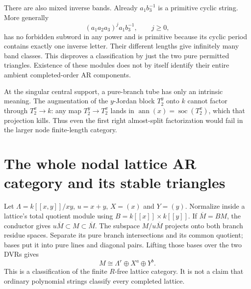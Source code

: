 \documentclass[11pt,oneside,openany]{book}
\theoremstyle{definition}\newtheorem{definition}[theorem]{Definition}
\theoremstyle{remark}\newtheorem{remark}[theorem]{Remark}
\begin{document}
There are also mixed inverse bands. Already $a_1b_3^{-1}$ is a primitive
cyclic string. More generally
\[
 (a_1a_2a_3)^j a_1b_3^{-1},\qquad j\ge0,
\]
has no forbidden subword in any power and is primitive because its cyclic
period contains exactly one inverse letter. Their different lengths give
infinitely many band classes. This disproves a classification by just the
two pure permitted triangles. Existence of these modules does not by itself
identify their entire ambient completed-order AR components.

At the singular central support, a pure-branch tube has only an intrinsic
meaning. The augmentation of the $y$-Jordan block $T_2^y$ onto $k$ cannot
factor through $T_2^x\to k$: any map $T_2^y\to T_2^x$ lands in
$\operatorname{ann}(x)=\operatorname{soc}(T_2^x)$, which that projection kills.
Thus even the first right almost-split factorization would fail in the larger
node finite-length category.

\section[Nodal lattice AR geometry]{The whole nodal lattice AR category and its stable triangles}
Let $\Lambda=k[[x,y]]/xy$, $u=x+y$, $X=(x)$ and $Y=(y)$. Normalize inside a
lattice's total quotient module using $B=k[[x]]\times k[[y]]$. If
$\overline M=BM$, the conductor gives
$u\overline M\subset M\subset\overline M$. The subspace
$M/u\overline M$ projects onto both branch residue spaces. Separate its pure
branch intersections and its common quotient; bases put it into pure lines
and diagonal pairs. Lifting those bases over the two DVRs gives
\begin{equation}\label{arb:nodeclassification}
 M\cong\Lambda^r\oplus X^a\oplus Y^b.
\end{equation}
This is a classification of the finite $R$-free lattice category. It is not a
claim that ordinary polynomial strings classify every completed lattice.
\end{document}
